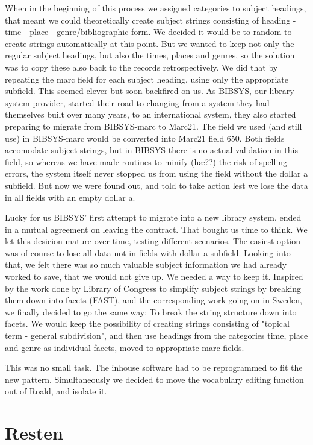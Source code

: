 When in the beginning of this process we assigned categories to subject headings, that meant we could theoretically create subject strings consisting of heading - time - place - genre/bibliographic form. We decided it would be to random to create strings automatically at this point. But we wanted to keep not only the regular subject headings, but also the times, places and genres, so the solution was to copy these also back to the records retrospectively. We did that by repeating the marc field for each subject heading, using only the appropriate subfield. This seemed clever but soon backfired on us. As BIBSYS, our library system provider, started their road to changing from a system they had themselves built over many years, to an international system, they also started preparing to migrate from BIBSYS-marc to Marc21. The field we used (and still use) in BIBSYS-marc would be converted into Marc21 field 650. Both fields accomodate subject strings, but in BIBSYS there is no actual validation in this field, so whereas we have made routines to minify (hæ??) the risk of spelling errors, the system itself never stopped us from using the field without the dollar a subfield. But now we were found out, and told to take action lest we lose the data in all fields with an empty dollar a. 

Lucky for us BIBSYS' first attempt to migrate into a new library system, ended in a mutual agreement on leaving the contract. That bought us time to think. We let this desicion mature over time, testing different scenarios. The easiest option was of course to lose all data not in fields with dollar a subfield. Looking into that, we felt there was so much valuable subject information we had already worked to save, that we would not give up. We needed a way to keep it. Inspired by the work done by Library of Congress to simplify subject strings by breaking them down into facets (FAST), and the corresponding work going on in Sweden, we finally decided to go the same way: To break the string structure down into facets. We would keep the possibility of creating strings consisting of "topical term - general subdivision", and then use headings from the categories time, place and genre as individual facets, moved to appropriate marc fields. 

This was no small task. The inhouse software had to be reprogrammed to fit the new pattern. Simultaneously we decided to move the vocabulary editing function out of Roald, and isolate it. 

\section{Resten}

